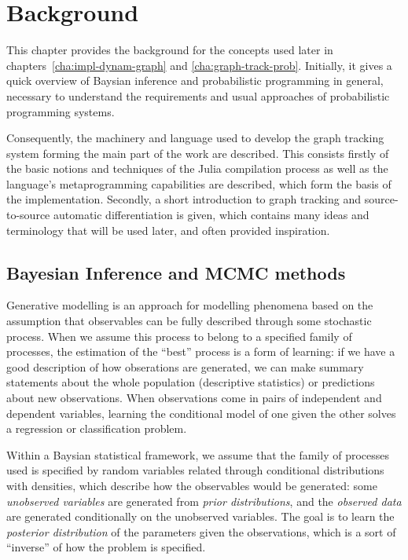 \chapter{Background}
\label{cha:background}

This chapter provides the background for the concepts used later in
chapters~\ref{cha:impl-dynam-graph} and \ref{cha:graph-track-prob}.  Initially, it gives a quick
overview of Baysian inference and probabilistic programming in general, necessary to understand the
requirements and usual approaches of probabilistic programming systems.

Consequently, the machinery and language used to develop the graph tracking system forming the main
part of the work are described.  This consists firstly of the basic notions and techniques of the
Julia compilation process as well as the language's metaprogramming capabilities are described,
which form the basis of the implementation.  Secondly, a short introduction to graph tracking and
source-to-source automatic differentiation is given, which contains many ideas and terminology that
will be used later, and often provided inspiration.


\section{Bayesian Inference and MCMC methods}
\label{sec:bayes-infer}

Generative modelling is an approach for modelling phenomena based on the assumption that
observables can be fully described through some stochastic process.  When we assume this process to
belong to a specified family of processes, the estimation of the \enquote{best} process is a form of
learning: if we have a good description of how obserations are generated, we can make summary
statements about the whole population (descriptive statistics) or predictions about new
observations.  When observations come in pairs of independent and dependent variables, learning the
conditional model of one given the other solves a regression or classification problem.

Within a Baysian statistical framework, we assume that the family of processes used is specified by
random variables related through conditional distributions with densities, which describe how the
observables would be generated: some \emph{unobserved variables} are generated from \emph{prior
  distributions}, and the \emph{observed data} are generated conditionally on the unobserved
variables.  The goal is to learn the \emph{posterior distribution} of the parameters given the
observations, which is a sort of \enquote{inverse} of how the problem is specified.

